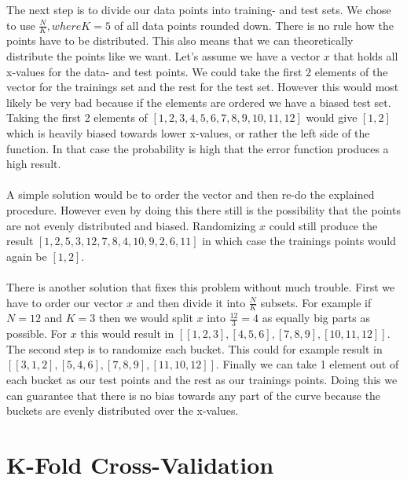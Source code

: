 \documentclass{article}
\begin{document}
	\noindent The next step is to divide our data points into training- and test sets. We chose to use $\frac{N}{K}, where K = 5$ of all data points rounded down. There is no rule how the points have to be distributed. This also means that we can theoretically distribute the points like we want. Let's assume we have a vector $x$ that holds all x-values for the data- and test points. We could take the first $2$ elements of the vector for the trainings set and the rest for the test set. However this would most likely be very bad because if the elements are ordered we have a biased test set. Taking the first 2 elements of $[1,2,3,4,5,6,7,8,9,10,11,12]$ would give $[1,2]$ which is heavily biased towards lower x-values, or rather the left side of the function. In that case the probability is high that the error function produces a high result.\\
	\\
	A simple solution would be to order the vector and then re-do the explained procedure. However even by doing this there still is the possibility that the points are not evenly distributed and biased. Randomizing $x$ could still produce the result $[1,2,5,3,12,7,8,4,10,9,2,6,11]$ in which case the trainings points would again be $[1,2]$. \\
	\\
	There is another solution that fixes this problem without much trouble. First we have to order our vector $x$ and then divide it into $\frac{N}{K}$ subsets. For example if $N = 12$ and $K = 3$ then we would split $x$ into $\frac{12}{3} = 4$ as equally big parts as possible. For $x$ this would result in $[[1,2,3],[4,5,6],[7,8,9],[10,11,12]]$. The second step is to randomize each bucket. This could for example result in $[[3,1,2],[5,4,6],[7,8,9],[11,10,12]]$. Finally we can take 1 element out of each bucket as our test points and the rest as our trainings points. Doing this we can guarantee that there is no bias towards any part of the curve because the buckets are evenly distributed over the x-values.
	
	
	\section{K-Fold Cross-Validation}
	\label{sec:K-FoldCrossValidation}
	
\end{document}
